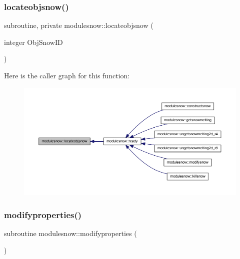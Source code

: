 \subsubsection{\texorpdfstring{locateobjsnow()}{locateobjsnow()}}
{\footnotesize\ttfamily subroutine, private modulesnow\+::locateobjsnow (\begin{DoxyParamCaption}\item[{integer}]{Obj\+Snow\+ID }\end{DoxyParamCaption})\hspace{0.3cm}{\ttfamily [private]}}

Here is the caller graph for this function\+:\nopagebreak
\begin{figure}[H]
\begin{center}
\leavevmode
\includegraphics[width=350pt]{namespacemodulesnow_abd7d9e3dda07461c69e66347c0a3d904_icgraph}
\end{center}
\end{figure}
\mbox{\label{namespacemodulesnow_aada914398244e3d136722b4c1c7a5abf}} 
\subsubsection{\texorpdfstring{modifyproperties()}{modifyproperties()}}
{\footnotesize\ttfamily subroutine modulesnow\+::modifyproperties (\begin{DoxyParamCaption}{ }\end{DoxyParamCaption})\hspace{0.3cm}{\ttfamily [private]}}

